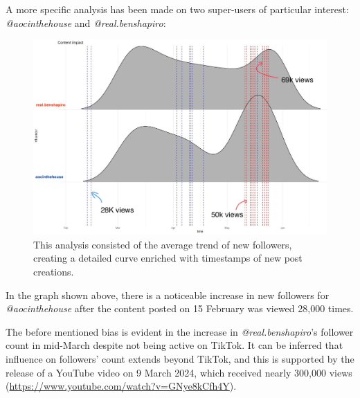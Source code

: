 A more specific analysis has been made on two super-users of particular interest: \textit{@aocinthehouse} and \textit{@real.benshapiro}:

\begin{figure}[H]
    \centering
    \includegraphics[width = .48\textwidth]{images/Final_ContentImpact_Custom.jpg}
    \caption*{This analysis consisted of the average trend of new followers, creating a detailed curve enriched with timestamps of new post creations.}
\end{figure}

In the graph shown above, there is a noticeable increase in new followers for \textit{@aocinthehouse} after the content posted on 15 February was viewed 28,000 times.

The before mentioned bias is evident in the increase in \textit{@real.benshapiro}'s follower count in mid-March despite not being active on TikTok. It can be inferred that influence on followers' count extends beyond TikTok, and this is supported by the release of a YouTube video on 9 March 2024, which received nearly 300,000 views (\url{https://www.youtube.com/watch?v=GNye8kCfh4Y}).